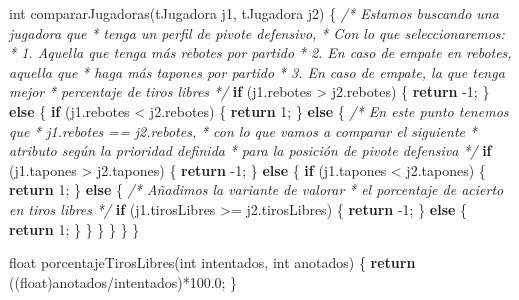 \documentclass[
]{book}
\newenvironment{Shaded}{\begin{snugshade}}{\end{snugshade}}
\newcommand{\CommentTok}[1]{\textcolor[rgb]{0.56,0.35,0.01}{\textit{#1}}}
\newcommand{\ControlFlowTok}[1]{\textcolor[rgb]{0.13,0.29,0.53}{\textbf{#1}}}
\newcommand{\DataTypeTok}[1]{\textcolor[rgb]{0.13,0.29,0.53}{#1}}
\newcommand{\DecValTok}[1]{\textcolor[rgb]{0.00,0.00,0.81}{#1}}
\newcommand{\FloatTok}[1]{\textcolor[rgb]{0.00,0.00,0.81}{#1}}
\newcommand{\NormalTok}[1]{#1}
\begin{document}
\begin{Shaded}
\begin{Highlighting}[]
\DataTypeTok{int}\NormalTok{ compararJugadoras(tJugadora j1, tJugadora j2) \{}
    \CommentTok{/* Estamos buscando una jugadora que}
\CommentTok{     * tenga un perfil de pivote defensivo,}
\CommentTok{     * Con lo que seleccionaremos:}
\CommentTok{     * 1. Aquella que tenga más rebotes por partido}
\CommentTok{     * 2. En caso de empate en rebotes, aquella que}
\CommentTok{     *    haga más tapones por partido}
\CommentTok{     * 3. En caso de empate, la que tenga mejor}
\CommentTok{     *    percentaje de tiros libres}
\CommentTok{     */} 
    \ControlFlowTok{if}\NormalTok{ (j1.rebotes \textgreater{} j2.rebotes) \{}
        \ControlFlowTok{return}\NormalTok{ {-}}\DecValTok{1}\NormalTok{;}
\NormalTok{    \} }\ControlFlowTok{else}\NormalTok{ \{}
        \ControlFlowTok{if}\NormalTok{ (j1.rebotes \textless{} j2.rebotes) \{}
            \ControlFlowTok{return} \DecValTok{1}\NormalTok{;}
\NormalTok{        \} }\ControlFlowTok{else}\NormalTok{ \{}
            \CommentTok{/* En este punto tenemos que}
\CommentTok{             * j1.rebotes == j2.rebotes,}
\CommentTok{             * con lo que vamos a comparar el siguiente}
\CommentTok{             * atributo según la prioridad definida}
\CommentTok{             * para la posición de pivote defensiva}
\CommentTok{             */}
            \ControlFlowTok{if}\NormalTok{ (j1.tapones \textgreater{} j2.tapones) \{}
                \ControlFlowTok{return}\NormalTok{ {-}}\DecValTok{1}\NormalTok{;}
\NormalTok{            \} }\ControlFlowTok{else}\NormalTok{ \{}
                \ControlFlowTok{if}\NormalTok{ (j1.tapones \textless{} j2.tapones) \{}
                    \ControlFlowTok{return} \DecValTok{1}\NormalTok{;}
\NormalTok{                \} }\ControlFlowTok{else}\NormalTok{ \{}
                    \CommentTok{/* Añadimos la variante de valorar}
\CommentTok{                     * el porcentaje de acierto en tiros libres}
\CommentTok{                     */}
                    \ControlFlowTok{if}\NormalTok{ (j1.tirosLibres \textgreater{}= j2.tirosLibres) \{}
                        \ControlFlowTok{return}\NormalTok{ {-}}\DecValTok{1}\NormalTok{;}
\NormalTok{                    \} }\ControlFlowTok{else}\NormalTok{ \{}
                        \ControlFlowTok{return} \DecValTok{1}\NormalTok{;}
\NormalTok{                    \}}
\NormalTok{                \}}
\NormalTok{            \}}
\NormalTok{        \}}
\NormalTok{    \}}
\NormalTok{\}}

\DataTypeTok{float}\NormalTok{ porcentajeTirosLibres(}\DataTypeTok{int}\NormalTok{ intentados, }\DataTypeTok{int}\NormalTok{ anotados) \{}
    \ControlFlowTok{return}\NormalTok{ ((}\DataTypeTok{float}\NormalTok{)anotados/intentados)*}\FloatTok{100.0}\NormalTok{;}
\NormalTok{\}}
\end{Highlighting}
\end{Shaded}
\end{document}
